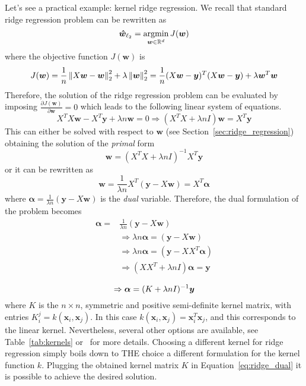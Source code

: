 			Let's see a practical example: kernel ridge regression. We recall that standard ridge regression problem can be rewritten as
			$$
			\bm{\hat w}_{\ell_2} = \mathop{\mathrm{argmin}}\limits_{\bm{w} \in \mathbb{R}^d} J(\bm{w})
			$$
			where the objective function $J(\bm{w})$ is
			$$
			J(\bm{w}) = \frac{1}{n}\left\lVert X\bm{w}-\bm{w}\right\rVert_2^2+\lambda\left\lVert\bm{w}\right\rVert_2^2 = \frac{1}{n}(X\bm{w}-\bm{y})^T(X\bm{w}-\bm{y})+\lambda\bm{w}^T\bm{w}
			$$
			Therefore, the solution of the ridge regression problem can be evaluated by imposing $\frac{\partial J(\bm{w})}{\partial \bm{w}}=0$ which leads to the following linear system of equations.
			$$
			X^TX\bm{w}-X^T\bm{y}+\lambda n \bm{w}=0 \Rightarrow (X^TX+\lambda n I)\bm{w} = X^T\bm{y}
			$$
			This can either be solved with respect to $\bm{w}$ (see Section~\ref{sec:ridge_regression}) obtaining the solution of the \textit{primal} form
			\begin{equation} \label{eq:ridge_backup}
				\bm{w} = (X^TX+\lambda n I)^{-1}X^T\bm{y}
		  \end{equation}
			or it can be rewritten as
			$$
			\bm{w} = \frac{1}{\lambda n} X^T(\bm{y}-X\bm{w}) = X^T\bm{\alpha}
			$$
			where $\bm{\alpha} = \frac{1}{\lambda n}(\bm{y} - X\bm{w})$ is the \textit{dual} variable. Therefore, the dual formulation of the problem becomes
			$$
				\begin{aligned}
					\bm{\alpha} = {} & \frac{1}{\lambda n}(\bm{y} - X\bm{w}) \\
						{} & \Rightarrow \lambda n \bm{\alpha} = (\bm{y} - X\bm{w})\\
						{} & \Rightarrow \lambda n \bm{\alpha} = (\bm{y} - XX^T\bm{\alpha})\\
						{} & \Rightarrow (XX^T + \lambda n I) \bm{\alpha} = \bm{y}\\
				\end{aligned}
			$$
			\begin{equation} \label{eq:ridge_dual}
				\Rightarrow \bm{\alpha} = (K + \lambda n I)^{-1}\bm{y} \\
			\end{equation}
			where $K$ is the $n \times n$, symmetric and positive semi-definite kernel matrix, with entries $K_i^j = k(\bm{x}_i, \bm{x}_j)$. In this case $k(\bm{x}_i, \bm{x}_j) = \bm{x}_i^T\bm{x}_j$, and this corresponds to the linear kernel. Nevertheless, several other options are available, see Table~\ref{tab:kernels} or~\cite{bishop2006pattern} for more details. Choosing a different kernel for ridge regression simply boils down to THE choice a different formulation for the kernel function $k$. Plugging the obtained kernel matrix $K$ in Equation~\eqref{eq:ridge_dual} it is possible to achieve the desired solution.

